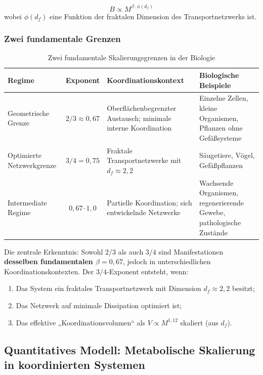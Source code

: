 \documentclass[12pt]{article}
\begin{document}
	\begin{equation}
		B \propto M^{\beta \cdot \phi(d_f)}
	\end{equation}
	wobei \(\phi(d_f)\) eine Funktion der fraktalen Dimension des Transportnetzwerks ist.
	
	\subsubsection{Zwei fundamentale Grenzen}
	
	\begin{table}[htbp]
		\centering
		\caption{Zwei fundamentale Skalierungsgrenzen in der Biologie}
		\label{tab:scaling-limits}
		\begin{tabular}{p{3.5cm}c p{6cm} p{5cm}}
			\toprule
			\textbf{Regime} & \textbf{Exponent} & \textbf{Koordinationskontext} & \textbf{Biologische Beispiele} \\
			\midrule
			Geometrische Grenze & \(2/3 \approx 0,67\) & Oberflächenbegrenzter Austausch; minimale interne Koordination & Einzelne Zellen, kleine Organismen, Pflanzen ohne Gefäßsysteme \cite{Glazier2005,Reich2006} \\
			Optimierte Netzwerkgrenze & \(3/4 = 0,75\) & Fraktale Transportnetzwerke mit \(d_f \approx 2,2\) & Säugetiere, Vögel, Gefäßpflanzen \cite{West1997} \\
			Intermediate Regime & \(0,67\)–\(1,0\) & Partielle Koordination; sich entwickelnde Netzwerke & Wachsende Organismen, regenerierende Gewebe, pathologische Zustände \cite{Glazier2005} \\
			\bottomrule
		\end{tabular}
	\end{table}
	
	Die zentrale Erkenntnis: Sowohl \(2/3\) als auch \(3/4\) sind Manifestationen \textbf{desselben fundamentalen \(\beta = 0,67\)}, jedoch in unterschiedlichen Koordinationskontexten. Der \(3/4\)-Exponent entsteht, wenn:
	\begin{enumerate}
		\item Das System ein fraktales Transportnetzwerk mit Dimension \(d_f \approx 2,2\) besitzt;
		\item Das Netzwerk auf minimale Dissipation optimiert ist;
		\item Das effektive „Koordinationsvolumen“ als \(V \propto M^{1,12}\) skaliert (aus \(d_f\)).
	\end{enumerate}
	
	\subsection{Quantitatives Modell: Metabolische Skalierung in koordinierten Systemen}
	
\end{document}
